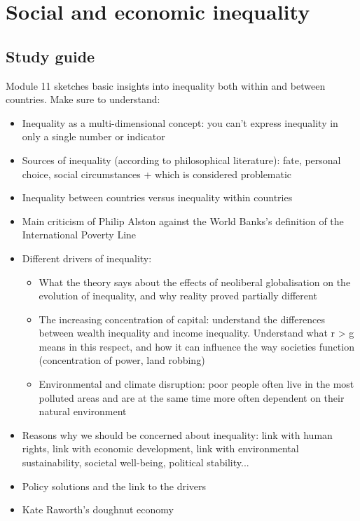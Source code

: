 \documentclass[../summary.tex]{subfiles}
\begin{document}
\section{Social and economic inequality}

\subsection{Study guide}

Module 11 sketches basic insights into inequality both within and between countries. Make sure to understand:
\begin{itemize}
	\item Inequality as a multi-dimensional concept: you can't express inequality in only a single number or indicator
	\item Sources of inequality (according to philosophical literature): fate, personal choice, social circumstances + which is considered problematic
	\item Inequality between countries versus inequality within countries
	\item Main criticism of Philip Alston against the World Banks's definition of the International Poverty Line
	\item Different drivers of inequality:
	      \begin{itemize}
		      \item What the theory says about the effects of neoliberal globalisation on the evolution of inequality, and why reality proved partially different
		      \item The increasing concentration of capital: understand the differences between wealth inequality and income inequality. Understand what r > g means in this respect, and how it can influence the way societies function (concentration of power, land robbing)
		      \item Environmental and climate disruption: poor people often live in the most polluted areas and are at the same time more often dependent on their natural environment
	      \end{itemize}
	\item Reasons why we should be concerned about inequality: link with human rights, link with economic development, link with environmental sustainability, societal well-being, political stability...
	\item Policy solutions and the link to the drivers
	\item Kate Raworth's doughnut economy
\end{itemize}
\end{document}
